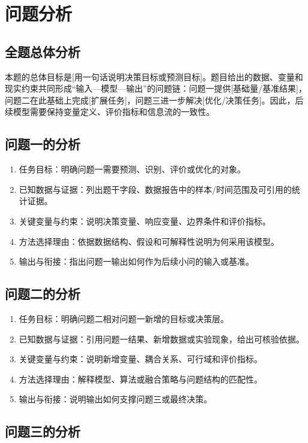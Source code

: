 \section{问题分析}

\subsection{全题总体分析}

本题的总体目标是[用一句话说明决策目标或预测目标]。题目给出的数据、变量和现实约束共同形成“输入—模型—输出”的问题链：问题一提供[基础量/基准结果]，问题二在此基础上完成[扩展任务]，问题三进一步解决[优化/决策任务]。因此，后续模型需要保持变量定义、评价指标和信息流的一致性。

\subsection{问题一的分析}

\begin{enumerate}
  \item 任务目标：明确问题一需要预测、识别、评价或优化的对象。
  \item 已知数据与证据：列出题干字段、数据报告中的样本/时间范围及可引用的统计证据。
  \item 关键变量与约束：说明决策变量、响应变量、边界条件和评价指标。
  \item 方法选择理由：依据数据结构、假设和可解释性说明为何采用该模型。
  \item 输出与衔接：指出问题一输出如何作为后续小问的输入或基准。
\end{enumerate}

\subsection{问题二的分析}

\begin{enumerate}
  \item 任务目标：明确问题二相对问题一新增的目标或决策层。
  \item 已知数据与证据：引用问题一结果、新增数据或实验现象，给出可核验依据。
  \item 关键变量与约束：说明新增变量、耦合关系、可行域和评价指标。
  \item 方法选择理由：解释模型、算法或融合策略与问题结构的匹配性。
  \item 输出与衔接：说明输出如何支撑问题三或最终决策。
\end{enumerate}

\subsection{问题三的分析}


